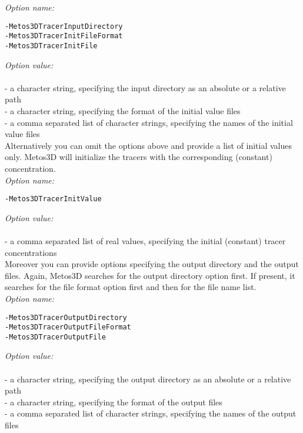 \documentclass{article}
\begin{document}
\emph{Option name:}
\begin{verbatim}
-Metos3DTracerInputDirectory
-Metos3DTracerInitFileFormat
-Metos3DTracerInitFile                              
\end{verbatim}

\emph{Option value:} \\
\vspace{-0.3cm}\\
- a character string, specifying the input directory as an absolute or a relative path \\
- a character string, specifying the format of the initial value files \\
- a comma separated list of character strings, specifying the names of the initial value files \\

Alternatively you can omit the options above and provide a list of initial values only.
Metos3D will initialize the tracers with the corresponding (constant) concentration. \\

\emph{Option name:}
\begin{verbatim}
-Metos3DTracerInitValue
\end{verbatim}

\emph{Option value:} \\
\vspace{-0.3cm}\\
- a comma separated list of real values, specifying the initial (constant) tracer concentrations \\

Moreover you can provide options specifying the output directory and the output files.
Again, Metos3D searches for the output directory option first. If present,
it searches for the file format option first and then for the file name list. \\

\emph{Option name:}
\begin{verbatim}
-Metos3DTracerOutputDirectory
-Metos3DTracerOutputFileFormat
-Metos3DTracerOutputFile
\end{verbatim}

\emph{Option value:} \\
\vspace{-0.3cm}\\
- a character string, specifying the output directory as an absolute or a relative path \\
- a character string, specifying the format of the output files \\
- a comma separated list of character strings, specifying the names of the output files \\
\end{document}
